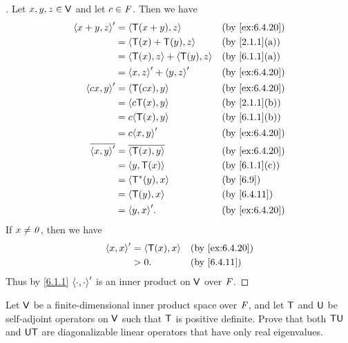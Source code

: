 \begin{proof}[]
  Let \(x, y, z \in \mathsf{V}\) and let \(c \in \mathit{F}\).
  Then we have
  \begin{align*}
    \inn{x + y, z}'    & = \inn{\T(x + y), z}              &  & \by{ex:6.4.20} \\
                       & = \inn{\T(x) + \T(y), z}          &  & \by{2.1.1}[a]  \\
                       & = \inn{\T(x), z} + \inn{\T(y), z} &  & \by{6.1.1}[a]  \\
                       & = \inn{x, z}' + \inn{y, z}'       &  & \by{ex:6.4.20} \\
    \inn{cx, y}'       & = \inn{\T(cx), y}                 &  & \by{ex:6.4.20} \\
                       & = \inn{c \T(x), y}                &  & \by{2.1.1}[b]  \\
                       & = c \inn{\T(x), y}                &  & \by{6.1.1}[b]  \\
                       & = c \inn{x, y}'                   &  & \by{ex:6.4.20} \\
    \conj{\inn{x, y}'} & = \conj{\inn{\T(x), y}}           &  & \by{ex:6.4.20} \\
                       & = \inn{y, \T(x)}                  &  & \by{6.1.1}[c]  \\
                       & = \inn{\T^*(y), x}                &  & \by{6.9}       \\
                       & = \inn{\T(y), x}                  &  & \by{6.4.11}    \\
                       & = \inn{y, x}'.                    &  & \by{ex:6.4.20}
  \end{align*}
  If \(x \neq \mathit{0}\), then we have
  \begin{align*}
    \inn{x, x}' & = \inn{\T(x), x} &  & \by{ex:6.4.20} \\
                & > 0.             &  & \by{6.4.11}
  \end{align*}
  Thus by \cref{6.1.1} \(\left\langle\cdot, \cdot\right\rangle'\) is an inner product on \(\mathsf{V}\) over \(\mathit{F}\).
\end{proof}

\begin{ex}\label{ex:6.4.21}
  Let \(\mathsf{V}\) be a finite-dimensional inner product space over \(\mathit{F}\), and let \(\mathsf{T}\) and \(\mathsf{U}\) be self-adjoint operators on \(\mathsf{V}\) such that \(\mathsf{T}\) is positive definite.
  Prove that both \(\mathsf{T} \mathsf{U}\) and \(\mathsf{U} \mathsf{T}\) are diagonalizable linear operators that have only real eigenvalues.
\end{ex}


